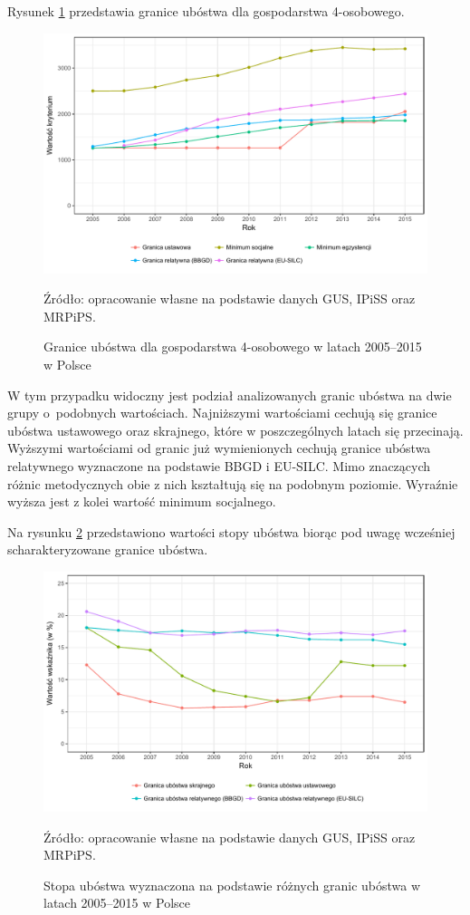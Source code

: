 Rysunek \ref{fig:gr_4os} przedstawia granice ubóstwa dla gospodarstwa 4-osobowego.

\begin{figure}[ht]
\includegraphics[width=\textwidth]{01_wykresy/gr_4os-1.pdf}
\caption{Granice ubóstwa dla gospodarstwa 4-osobowego w latach 2005--2015 w Polsce}
\small{Źródło: opracowanie własne na podstawie danych GUS, IPiSS oraz MRPiPS.}
\label{fig:gr_4os}
\end{figure}

W tym przypadku widoczny jest podział analizowanych granic ubóstwa na dwie grupy o~podobnych wartościach. Najniższymi wartościami cechują się granice ubóstwa ustawowego oraz skrajnego, które w poszczególnych latach się przecinają. Wyższymi wartościami od granic już wymienionych cechują granice ubóstwa relatywnego wyznaczone na podstawie BBGD i EU-SILC. Mimo znaczących różnic metodycznych obie z nich kształtują się na podobnym poziomie. Wyraźnie wyższa jest z kolei wartość minimum socjalnego.

Na rysunku \ref{fig:gr_stopa_ub} przedstawiono wartości stopy ubóstwa biorąc pod uwagę wcześniej scharakteryzowane granice ubóstwa.

\begin{figure}[ht]
\includegraphics[width=\textwidth]{01_wykresy/gr_stopa_ub-1.pdf}
\caption{Stopa ubóstwa wyznaczona na podstawie różnych granic ubóstwa w latach 2005--2015 w Polsce}
\small{Źródło: opracowanie własne na podstawie danych GUS, IPiSS oraz MRPiPS.}
\label{fig:gr_stopa_ub}
\end{figure}

